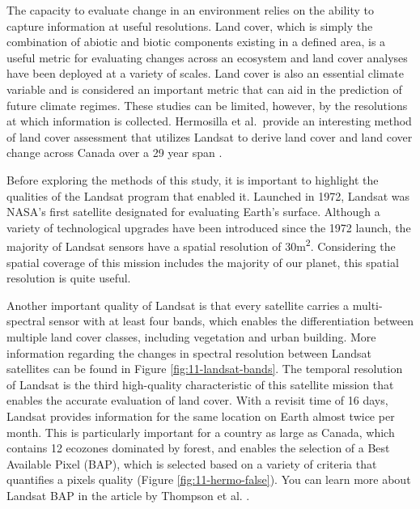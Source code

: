 \documentclass[
]{book}
\begin{document}
The capacity to evaluate change in an environment relies on the ability to capture information at useful resolutions. Land cover, which is simply the combination of abiotic and biotic components existing in a defined area, is a useful metric for evaluating changes across an ecosystem and land cover analyses have been deployed at a variety of scales. Land cover is also an essential climate variable and is considered an important metric that can aid in the prediction of future climate regimes. These studies can be limited, however, by the resolutions at which information is collected. Hermosilla et al.~provide an interesting method of land cover assessment that utilizes Landsat to derive land cover and land cover change across Canada over a 29 year span \citep{hermosilla_disturbance-informed_2018}.

Before exploring the methods of this study, it is important to highlight the qualities of the Landsat program that enabled it. Launched in 1972, Landsat was NASA's first satellite designated for evaluating Earth's surface. Although a variety of technological upgrades have been introduced since the 1972 launch, the majority of Landsat sensors have a spatial resolution of 30m\textsuperscript{2}. Considering the spatial coverage of this mission includes the majority of our planet, this spatial resolution is quite useful.

Another important quality of Landsat is that every satellite carries a multi-spectral sensor with at least four bands, which enables the differentiation between multiple land cover classes, including vegetation and urban building. More information regarding the changes in spectral resolution between Landsat satellites can be found in Figure \ref{fig:11-landsat-bands}. The temporal resolution of Landsat is the third high-quality characteristic of this satellite mission that enables the accurate evaluation of land cover. With a revisit time of 16 days, Landsat provides information for the same location on Earth almost twice per month. This is particularly important for a country as large as Canada, which contains 12 ecozones dominated by forest, and enables the selection of a Best Available Pixel (BAP), which is selected based on a variety of criteria that quantifies a pixels quality (Figure \ref{fig:11-hermo-false}). You can learn more about Landsat BAP in the article by Thompson et al. \citep{thompson_mapping_2015}.
\end{document}
